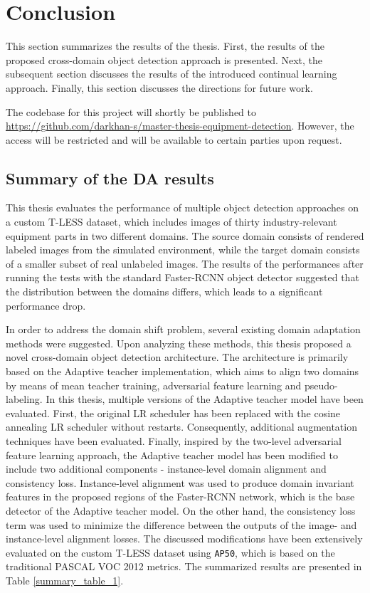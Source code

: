 
\section{Conclusion} 
This section summarizes the results of the thesis. First, the results of the proposed cross-domain object detection approach is presented. Next, the subsequent section discusses the results of the introduced continual learning approach. Finally, this section discusses the directions for future work. 

The codebase for this project will shortly be published to \url{https://github.com/darkhan-s/master-thesis-equipment-detection}. However, the access will be restricted and will be available to certain parties upon request.  

\subsection{Summary of the DA results}

This thesis evaluates the performance of multiple object detection approaches on a custom T-LESS dataset, which includes images of thirty industry-relevant equipment parts in two different domains. The source domain consists of rendered labeled images from the simulated environment, while the target domain consists of a smaller subset of real unlabeled images. The results of the performances after running the tests with the  standard Faster-RCNN object detector suggested that the distribution between the domains differs, which leads to a significant performance drop. 

In order to address the domain shift problem, several existing domain adaptation methods were suggested. Upon analyzing these methods, this thesis proposed a novel cross-domain object detection architecture. The architecture is primarily based on the Adaptive teacher implementation, which aims to align two domains by means of mean teacher training, adversarial feature learning and pseudo-labeling. In this thesis, multiple versions of the Adaptive teacher model have been evaluated. First, the original LR scheduler has been replaced with the cosine annealing LR scheduler without restarts. Consequently, additional augmentation techniques have been evaluated. Finally, inspired by the two-level adversarial feature learning approach, the Adaptive teacher model has been modified to include two additional components - instance-level domain alignment and consistency loss. Instance-level alignment was used to produce domain invariant features in the proposed regions of the Faster-RCNN network, which is the base detector of the Adaptive teacher model. On the other hand, the consistency loss term was used to minimize the difference between the outputs of the image- and instance-level alignment losses. The discussed modifications have been extensively evaluated on the custom T-LESS dataset using \texttt{AP50}, which is based on the traditional PASCAL VOC 2012 metrics. The summarized results are presented in Table \ref{summary_table_1}. 

